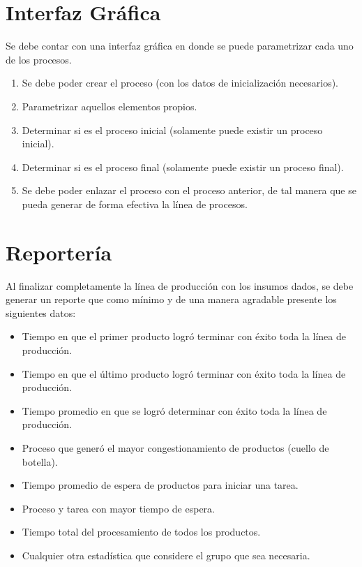 \documentclass[12pt,letterpaper]{article}
\newcommand{\cmark}{\textcolor{checkgreen}{\ding{51}}}
\begin{document}
\section*{Interfaz Gráfica}

Se debe contar con una interfaz gráfica en donde se puede parametrizar cada uno de los procesos.

\begin{enumerate}
    \item Se debe poder crear el proceso (con los datos de inicialización necesarios).
    \item Parametrizar aquellos elementos propios.
    \item Determinar si es el proceso inicial (solamente puede existir un proceso inicial).
    \item Determinar si es el proceso final (solamente puede existir un proceso final).
    \item Se debe poder enlazar el proceso con el proceso anterior, de tal manera que se pueda generar de forma efectiva la línea de procesos. \hfill \cmark
\end{enumerate}

\section*{Reportería}

Al finalizar completamente la línea de producción con los insumos dados, se debe generar un reporte que como mínimo y de una manera agradable presente los siguientes datos: \hfill \cmark

\begin{itemize}
    \item Tiempo en que el primer producto logró terminar con éxito toda la línea de producción.
    \item Tiempo en que el último producto logró terminar con éxito toda la línea de producción.
    \item Tiempo promedio en que se logró determinar con éxito toda la línea de producción.
    \item Proceso que generó el mayor congestionamiento de productos (cuello de botella).
    \item Tiempo promedio de espera de productos para iniciar una tarea.
    \item Proceso y tarea con mayor tiempo de espera.
    \item Tiempo total del procesamiento de todos los productos.
    \item Cualquier otra estadística que considere el grupo que sea necesaria.
\end{itemize}
\end{document}
